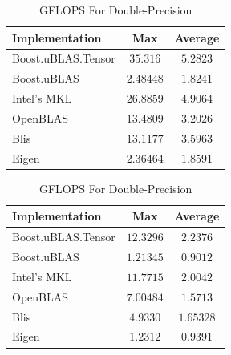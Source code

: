 \begin{table}[ht]
    \centering
    \caption{GFLOPS For Single-Precision}
    \begin{tabular}{|l|c|c|}
        \hline
        \textbf{Implementation} & \textbf{Max} & \textbf{Average}\\
        \hline
        Boost.uBLAS.Tensor  & $35.316$ & $5.2823$ \\
        \hline
        Boost.uBLAS         & $2.48448$ & $1.8241$ \\
        \hline
        Intel's MKL         & $26.8859$ & $4.9064$ \\
        \hline
        OpenBLAS            & $13.4809$ & $3.2026$ \\
        \hline
        Blis                & $13.1177$ & $3.5963$ \\
        \hline
        Eigen               & $2.36464$ & $1.8591$ \\
        \hline
    \end{tabular}

    \vspace*{1 cm}

    \centering
    \caption{GFLOPS For Double-Precision}
    \begin{tabular}{|l|c|c|}
        \hline
        \textbf{Implementation} & \textbf{Max} & \textbf{Average}\\
        \hline
        Boost.uBLAS.Tensor  & $12.3296$ & $2.2376$ \\
        \hline
        Boost.uBLAS         & $1.21345$ & $0.9012$ \\
        \hline
        Intel's MKL         & $11.7715$ & $2.0042$ \\
        \hline
        OpenBLAS            & $7.00484$ & $1.5713$ \\
        \hline
        Blis                & $4.9330$ & $1.65328$ \\
        \hline
        Eigen               & $1.2312$ & $0.9391$ \\
        \hline
    \end{tabular}
\end{table}

